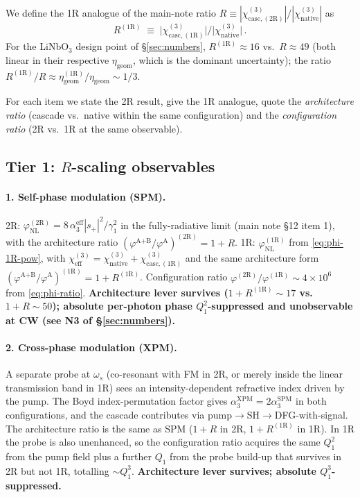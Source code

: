 \documentclass[11pt,a4paper]{article}
\newcommand{\chithree}{\chi^{(3)}}
\newcommand{\chicascOneR}{\chi^{(3)}_{\text{casc},(1\mathrm R)}}
\newcommand{\chicascTwoR}{\chi^{(3)}_{\text{casc},(2\mathrm R)}}
\begin{document}
We define the 1R analogue of the main-note ratio
$R\equiv|\chicascTwoR|/|\chithree_\text{native}|$ as
\begin{equation*}
  R^{(1\mathrm R)}\;\equiv\;\bigl|\chicascOneR\bigr|/\bigl|\chithree_\text{native}\bigr|\,.
\end{equation*}
For the LiNbO$_3$ design point of \S\ref{sec:numbers},
$R^{(1\mathrm R)}\!\approx\!16$ vs.\ $R\!\approx\!49$ (both linear in
their respective $\eta_\text{geom}$, which is the dominant uncertainty); the ratio
$R^{(1\mathrm R)}/R\approx\eta_\text{geom}^{(1\mathrm R)}/\eta_\text{geom}\sim 1/3$.

For each item we state the 2R result, give the 1R analogue, quote the
\emph{architecture ratio} (cascade vs.\ native within the same
configuration) and the \emph{configuration ratio} (2R vs.\ 1R at the
same observable).

\subsection*{Tier 1: \texorpdfstring{$R$}{R}-scaling observables}

\paragraph{1. Self-phase modulation (SPM).}
2R:
$\varphi_\text{NL}^{(2\mathrm R)}=8\,\alpha_3^\text{eff}|s_+|^{2}/\gamma_1^{2}$
in the fully-radiative limit (main note \S 12 item 1), with the
architecture ratio
$(\varphi^\text{A+B}/\varphi^\text{A})^{(2\mathrm R)}=1+R$.
1R: $\varphi_\text{NL}^{(1\mathrm R)}$ from \eqref{eq:phi-1R-pow}, with
$\chithree_\text{eff}=\chithree_\text{native}+\chicascOneR$ and the same
architecture form
$(\varphi^\text{A+B}/\varphi^\text{A})^{(1\mathrm R)}=1+R^{(1\mathrm R)}$.
Configuration ratio
$\varphi^{(2\mathrm R)}/\varphi^{(1\mathrm R)}\!\sim\!4\times10^{6}$ from
\eqref{eq:phi-ratio}.
\textbf{Architecture lever survives ($1+R^{(1\mathrm R)}\!\sim\!17$ vs.\
$1+R\!\sim\!50$); absolute per-photon phase $Q_1^{2}$-suppressed and
unobservable at CW (see N3 of \S\ref{sec:numbers}).}

\paragraph{2. Cross-phase modulation (XPM).}
A separate probe at $\omega_s$ (co-resonant with FM in 2R, or merely
inside the linear transmission band in 1R) sees an intensity-dependent
refractive index driven by the pump.  The Boyd index-permutation factor
gives $\alpha_3^\text{XPM}=2\alpha_3^\text{SPM}$ in both configurations,
and the cascade contributes via pump$\to$SH$\to$DFG-with-signal.  The
architecture ratio is the same as SPM ($1+R$ in 2R, $1+R^{(1\mathrm R)}$
in 1R).  In 1R the probe is also unenhanced, so the configuration ratio
acquires the same $Q_1^{2}$ from the pump field plus a further $Q_1$
from the probe build-up that survives in 2R but not 1R, totalling
$\sim Q_1^{3}$.  \textbf{Architecture lever survives; absolute
$Q_1^{3}$-suppressed.}
\end{document}
